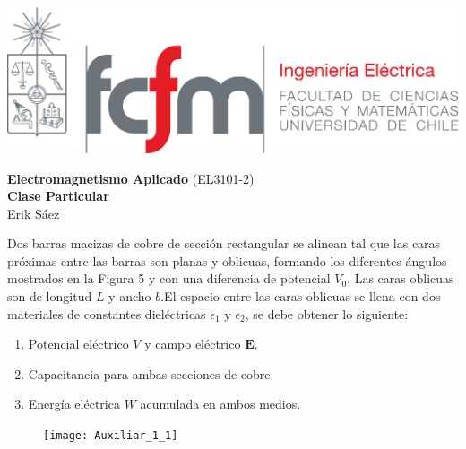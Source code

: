 \documentclass[
  11pt,
  letterpaper,
   addpoints,
   answers
  ]{exam}
\begin{document}
\noindent
\begin{minipage}{0.47\textwidth}
\includegraphics[width=\textwidth]{../fcfm_die}
\end{minipage}
\begin{minipage}{0.53\textwidth}
\begin{center} 
\large\textbf{Electromagnetismo Aplicado} (EL3101-2) \\
\large\textbf{Clase Particular} \\
\small Erik Sáez\\
\end{center}
\end{minipage}

\vspace{0.5cm}
\noindent
\vspace{.85cm}

\begin{questions}
    \question Dos barras macizas de cobre de sección rectangular se alinean tal que las caras próximas entre las barras son planas y oblicuas, formando los diferentes ángulos mostrados en la Figura 5 y con una diferencia de potencial $V_0$. Las caras oblicuas son de longitud $L$ y ancho $b$.El espacio entre las caras oblicuas se llena con dos materiales de constantes dieléctricas $\epsilon_1$ y $\epsilon_2$, se debe obtener lo siguiente:
        \begin{enumerate}
            \item Potencial eléctrico $V$ y campo eléctrico $\mathbf{E}$.
            \item Capacitancia para ambas secciones de cobre.
            \item Energía eléctrica $W$ acumulada en ambos medios.
        \end{enumerate}
    \begin{figure}[h!]
        \centering
        \texttt{[image: Auxiliar\_1\_1]}
    \end{figure}
   

\end{questions}
\newpage
\end{document}
